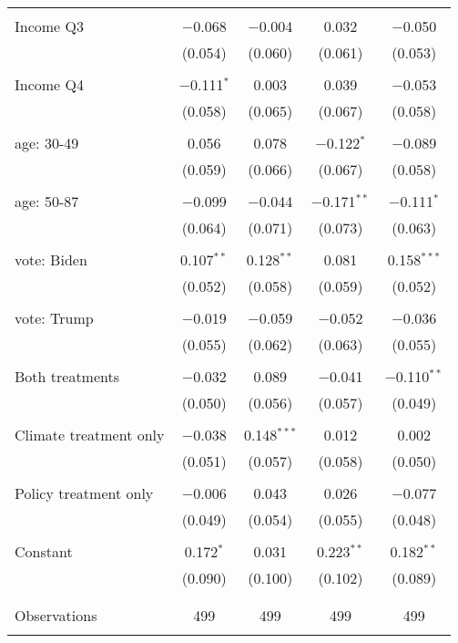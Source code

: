 \begin{tabular}{@{\extracolsep{5pt}}lcccc}
  & & & & \\ 
 Income Q3 & $-$0.068 & $-$0.004 & 0.032 & $-$0.050 \\ 
  & (0.054) & (0.060) & (0.061) & (0.053) \\ 
  & & & & \\ 
 Income Q4 & $-$0.111$^{*}$ & 0.003 & 0.039 & $-$0.053 \\ 
  & (0.058) & (0.065) & (0.067) & (0.058) \\ 
  & & & & \\ 
 age: 30-49 & 0.056 & 0.078 & $-$0.122$^{*}$ & $-$0.089 \\ 
  & (0.059) & (0.066) & (0.067) & (0.058) \\ 
  & & & & \\ 
 age: 50-87 & $-$0.099 & $-$0.044 & $-$0.171$^{**}$ & $-$0.111$^{*}$ \\ 
  & (0.064) & (0.071) & (0.073) & (0.063) \\ 
  & & & & \\ 
 vote: Biden & 0.107$^{**}$ & 0.128$^{**}$ & 0.081 & 0.158$^{***}$ \\ 
  & (0.052) & (0.058) & (0.059) & (0.052) \\ 
  & & & & \\ 
 vote: Trump & $-$0.019 & $-$0.059 & $-$0.052 & $-$0.036 \\ 
  & (0.055) & (0.062) & (0.063) & (0.055) \\ 
  & & & & \\ 
 Both treatments & $-$0.032 & 0.089 & $-$0.041 & $-$0.110$^{**}$ \\ 
  & (0.050) & (0.056) & (0.057) & (0.049) \\ 
  & & & & \\ 
 Climate treatment only & $-$0.038 & 0.148$^{***}$ & 0.012 & 0.002 \\ 
  & (0.051) & (0.057) & (0.058) & (0.050) \\ 
  & & & & \\ 
 Policy treatment only & $-$0.006 & 0.043 & 0.026 & $-$0.077 \\ 
  & (0.049) & (0.054) & (0.055) & (0.048) \\ 
  & & & & \\ 
 Constant & 0.172$^{*}$ & 0.031 & 0.223$^{**}$ & 0.182$^{**}$ \\ 
  & (0.090) & (0.100) & (0.102) & (0.089) \\ 
  & & & & \\ 
\hline \\[-1.8ex] 

Observations & 499 & 499 & 499 & 499 \\ 
\hline 
\hline \\[-1.8ex] 
\end{tabular} 